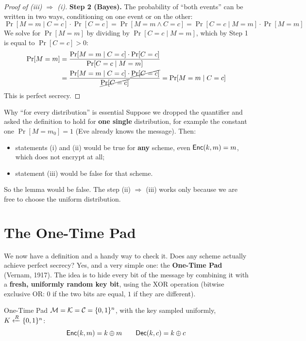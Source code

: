 \begin{proof}[Proof of (iii) $\Rightarrow$ (i)]
  \textbf{Step 2 (Bayes).} The probability of ``both events'' can be written in two ways, conditioning on one event or on the other:
  \[
    \Pr[M = m \mid C = c] \cdot \Pr[C = c] = \Pr[M = m \wedge C = c] = \Pr[C = c \mid M = m] \cdot \Pr[M = m]
  \]
  We solve for $\Pr[M = m]$ by dividing by $\Pr[C = c \mid M = m]$, which by Step 1 is equal to $\Pr[C = c] > 0$:
  \[
    \begin{aligned}
      \Pr[M = m] &= \frac{\Pr[M = m \mid C = c] \cdot \Pr[C = c]}{\Pr[C = c \mid M = m]} \\
      &= \frac{\Pr[M = m \mid C = c] \cdot \cancel{\Pr[C = c]}}{\cancel{\Pr[C = c]}} = \Pr[M = m \mid C = c]
    \end{aligned}
  \]
  This is perfect secrecy.
\end{proof}

\begin{framedobs}{Why ``for every distribution'' is essential}
  Suppose we dropped the quantifier and asked the definition to hold for \textbf{one single} distribution, for example the constant one $\Pr[M = m_0] = 1$ (Eve already knows the message). Then:
  \begin{itemize}
    \item statements (i) and (ii) would be true for \textbf{any} scheme, even $\mathsf{Enc}(k, m) = m$, which does not encrypt at all;
    \item statement (iii) would be false for that scheme.
  \end{itemize}
  So the lemma would be false. The step (ii) $\Rightarrow$ (iii) works only because we are free to choose the uniform distribution.
\end{framedobs}

\section{The One-Time Pad}\label{sec:otp}

We now have a definition and a handy way to check it. Does any scheme actually achieve perfect secrecy? Yes, and a very simple one: the \textbf{One-Time Pad} (Vernam, 1917). The idea is to hide every bit of the message by combining it with a \textbf{fresh, uniformly random key bit}, using the XOR operation (bitwise exclusive OR: $0$ if the two bits are equal, $1$ if they are different).

\begin{frameddefn}[label={def:otp}]{One-Time Pad}
  $\mathcal{M} = \mathcal{K} = \mathcal{C} = \{0,1\}^n$, with the key sampled uniformly, $K \xleftarrow{R} \{0,1\}^n$:
  \[
    \mathsf{Enc}(k, m) = k \oplus m \qquad \mathsf{Dec}(k, c) = k \oplus c
  \]
\end{frameddefn}


